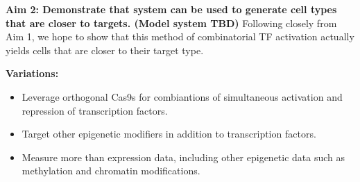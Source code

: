 \documentclass[10pt]{article}
\begin{document}
\textbf{Aim 2: Demonstrate that system can be used to generate cell types that are closer to targets. (Model system TBD)} Following closely from Aim 1, we hope to show that this method of combinatorial TF activation actually yields cells that are closer to their target type.
\newline

\textbf{Variations:}

\begin{itemize}

\item Leverage orthogonal Cas9s for combiantions of simultaneous activation and repression of transcription factors.

\item Target other epigenetic modifiers in addition to transcription factors.

\item Measure more than expression data, including other epigenetic data such as methylation and chromatin modifications.

\end{itemize}

\pagebreak



\end{document}
